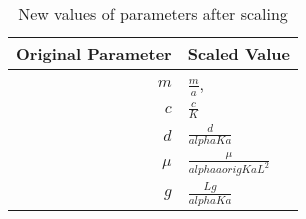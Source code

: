 \documentclass[review,authoryear]{elsarticle}
\def\alpha{alpha}%
\newcommand{\origAlpha}{{\alpha}}
\newcommand{\origK}{{K}}
\newcommand{\origA}{{a}}
\newcommand{\origC}{{c}}
\newcommand{\origD}{{d}}
\newcommand{\origG}{{g}}
\newcommand{\origL}{{L}}
\newcommand{\origMu}{{\mu}}
\begin{document}
\begin{table}[ht]
  \centering
  \begin{tabular}{r|l}
  Original Parameter & Scaled Value \\ \hline
    $m$   & $\frac{m}{a}$, \\  [10pt]
    $c$   & $\frac{\origC}{\origK}$ \\  [10pt]
    $d$   & $\frac{\origD}{\origAlpha\origK a}$ \\  [10pt]
    $\mu$ & $\frac{\origMu}{\origAlpha a origK\origA\origL^2}$  \\  [10pt]
    $g$   & $\frac{\origL\origG}{\origAlpha\origK a}$
  \end{tabular}
  \caption{New values of parameters after scaling}
  \label{tab:newParameters}
\end{table}
\end{document}
